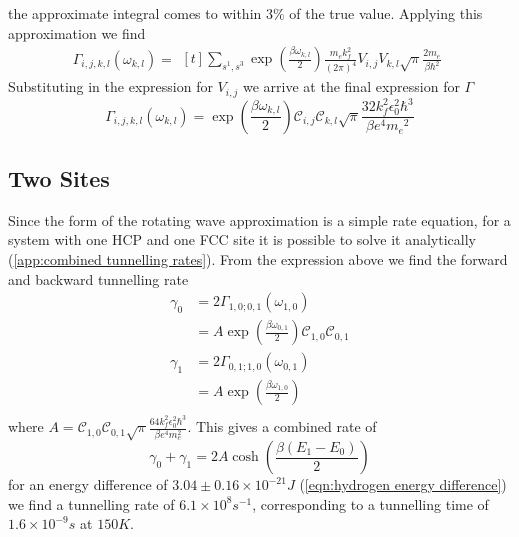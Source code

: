 the approximate
integral comes
to within \(3\% \)
of the true value.
Applying this approximation
we find
\begin{equation}
    \Gamma_{i,j, k,l}(\omega_{k,l}) =\begin{aligned}[t]
        \sum_{s^1,s^3} \exp{(\frac{\beta \omega_{k,l}}{2})} \frac{m_e k_f^2 }{{(2\pi)}^4}
        V_{i,j} V_{k,l} \sqrt{\pi} \frac{2m_e}{\beta \hbar^2}
    \end{aligned}
\end{equation}
Substituting in the expression
for \(V_{i,j}\)
we arrive at the final
expression for \(\Gamma \)
\begin{equation}
    \Gamma_{i,j, k,l}(\omega_{k,l})   =
    \exp{(\frac{\beta \omega_{k,l}}{2})}
    \mathcal{C}_{i,j} \mathcal{C}_{k,l}
    \sqrt{\pi} \frac{32 k_f^2 \epsilon_0^2 \hbar^3}{\beta e^4 {m_e}^2}
\end{equation}


\subsection{Two Sites}
Since the form of the rotating
wave approximation is a simple
rate equation, for a system
with one HCP and one FCC site
it is possible to solve it analytically
(\cref{app:combined tunnelling rates}).
From the expression above we find the
forward and backward tunnelling rate
\begin{align}
    \gamma_0 & = 2\Gamma_{1,0;0, 1}(\omega_{1,0})       \\
             & = A \exp{(\frac{\beta \omega_{0,1}}{2})}
    \mathcal{C}_{1,0} \mathcal{C}_{0,1}                 \\
    \gamma_1 & = 2\Gamma_{0,1;1, 0}(\omega_{0,1})       \\
             & = A \exp{(\frac{\beta \omega_{1,0}}{2})} \\
\end{align}
where
\(A =
\mathcal{C}_{1,0} \mathcal{C}_{0,1}
\sqrt{\pi}
\frac{64 k_f^2 \epsilon_0^2 \hbar^3}{\beta e^4 m_e^2}\).
This gives a combined rate of
\begin{equation}
    \gamma_0 + \gamma_1 = 2A\cosh{(\frac{\beta (E_1 - E_0)}{2})}
    \label{eqn:theoretical rate Lindblad equation}
\end{equation}
for an energy difference of
\(3.04\pm0.16\times{}10^{-21} J\)
(\cref{eqn:hydrogen energy difference})
we find a tunnelling rate of
\(6.1\times{}10^{8}s^{-1}\),
corresponding to a
tunnelling time of
\(1.6\times{}10^{-9}s\) at
\(150K\).


